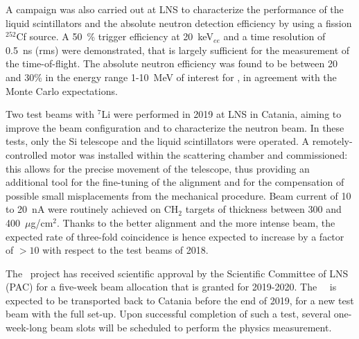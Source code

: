 A campaign was also carried out at LNS to characterize the performance of the liquid 
scintillators and the absolute neutron detection efficiency by using a fission $^{252}$Cf 
source.  A \SI{50}{\percent} trigger efficiency at 20~keV$_{ee}$ and a time resolution of 0.5~ns 
(rms) were demonstrated, that is largely sufficient for the measurement of the 
time-of-flight. The absolute neutron efficiency was found to be between 20 and 30\% in the 
energy range 1-10~MeV of interest for \ReD, in agreement with the Monte Carlo 
expectations.

Two test beams with $^{7}$Li were performed in 2019 at LNS in Catania, aiming to improve the beam configuration 
and to characterize the neutron beam. In these tests, only the Si telescope and the liquid 
scintillators were operated. A remotely-controlled motor was installed within the scattering 
chamber and commissioned: this allows for the precise movement of the telescope, 
thus providing an additional tool for the fine-tuning of the alignment and for the compensation 
of possible small misplacements from the mechanical procedure. Beam current of 10 to 20~nA were 
routinely achieved on CH$_2$ targets of thickness between 300 and 400~$\mu$g/cm$^2$. Thanks 
to the better alignment and the more intense beam, the expected rate of three-fold 
coincidence is hence expected to increase by a factor of $> 10$ with respect to the test 
beams of 2018.

The \ReD\ project has received scientific approval by the Scientific Committee of LNS (PAC) 
for a five-week beam allocation that is granted for 2019-2020.  The \ReD\ \LArTPC\ is 
expected to be transported back to Catania before the end of 2019, for a new test beam with 
the full set-up. Upon successful completion of such a test, several one-week-long beam 
slots will be scheduled to perform the physics measurement.

